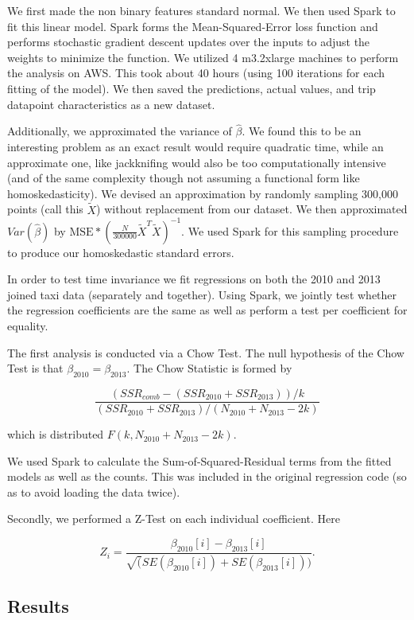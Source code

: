 \documentclass[twoside]{article}
\begin{document}
\begin{multicols}{2}
We first made the non binary features standard normal. We then used Spark to fit this linear model. Spark forms the Mean-Squared-Error loss function and performs stochastic gradient descent updates over the inputs to adjust the weights to minimize the function. We utilized 4 m3.2xlarge machines to perform the analysis on AWS. This took about 40 hours (using 100 iterations for each fitting of the model). We then saved the predictions, actual values, and trip datapoint characteristics as a new dataset. 

Additionally, we approximated the variance of $\hat{\beta}$. We found this to be an interesting problem as an exact result would require quadratic time, while an approximate one, like jackknifing would also be too computationally intensive (and of the same complexity though not assuming a functional form like homoskedasticity).  We devised an approximation by randomly sampling 300,000 points (call this $\tilde{X}$) without replacement from our dataset. We then approximated $Var(\hat{\beta})$ by $\text{MSE}*(\frac{N}{300000}\tilde{X}^T\tilde{X})^{-1}$. We used Spark for this sampling procedure to produce our homoskedastic standard errors. 

In order to test time invariance we fit regressions on both the 2010 and 2013 joined taxi data (separately and together). Using Spark, we jointly test whether the regression coefficients are the same as well as perform a test per coefficient for equality. 

The first analysis is conducted via a Chow Test.  The null hypothesis of the Chow Test is that $\beta_{2010} = \beta_{2013}$.  The Chow Statistic is formed by 

$$\frac{(SSR_{comb} - (SSR_{2010} + SSR_{2013}))/k}{(SSR_{2010} + SSR_{2013})/(N_{2010} + N_{2013}-2k)}$$

\noindent which is distributed $F(k, N_{2010} + N_{2013}-2k)$. 

We used Spark to calculate the Sum-of-Squared-Residual terms from the fitted models as well as the counts. This was included in the original regression code (so as to avoid loading the data twice). 

Secondly, we performed a Z-Test on each individual coefficient. Here

$$ Z_i = \frac{\beta_{2010}[i] - \beta_{2013}[i]}{\sqrt(SE(\beta_{2010}[i]) + SE(\beta_{2013}[i]))}.$$
\subsection{Results}


\end{multicols}
\end{document}

